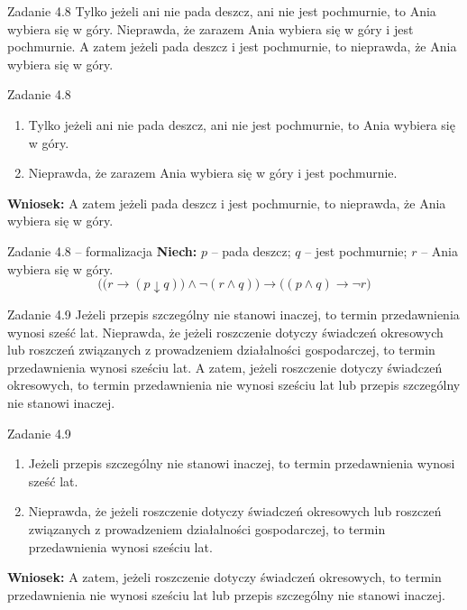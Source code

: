\documentclass[12pt]{beamer}
\begin{document}
\begin{frame}{Zadanie 4.8}
Tylko jeżeli ani nie pada deszcz, ani nie jest pochmurnie, to Ania wybiera się w góry. Nieprawda, że zarazem Ania wybiera się w góry i jest pochmurnie. A zatem jeżeli pada deszcz i jest pochmurnie, to nieprawda, że Ania wybiera się w góry.
\end{frame}

\begin{frame}{Zadanie 4.8}
\begin{enumerate}
    \item[P1.] Tylko jeżeli ani nie pada deszcz, ani nie jest pochmurnie, to Ania wybiera się w góry.
    \item[P2.] Nieprawda, że zarazem Ania wybiera się w góry i jest pochmurnie.
\end{enumerate}
\vspace{6pt}
\textbf{Wniosek:} A zatem jeżeli pada deszcz i jest pochmurnie, to nieprawda, że Ania wybiera się w góry.
\end{frame}

\begin{frame}{Zadanie 4.8 -- formalizacja}
\textbf{Niech:} $p$ -- pada deszcz; $q$ -- jest pochmurnie; $r$ -- Ania wybiera się w góry.
\vspace{10pt}
\[ \Big(\big(r \rightarrow (p \downarrow q)\big) \wedge \neg(r \wedge q)\Big) \rightarrow \big((p \wedge q) \rightarrow \neg r\big) \]
\end{frame}

\begin{frame}{Zadanie 4.9}
\footnotesize
Jeżeli przepis szczególny nie stanowi inaczej, to termin przedawnienia wynosi sześć lat. Nieprawda, że jeżeli roszczenie dotyczy świadczeń okresowych lub roszczeń związanych z prowadzeniem działalności gospodarczej, to termin przedawnienia wynosi sześciu lat. A zatem, jeżeli roszczenie dotyczy świadczeń okresowych, to termin przedawnienia nie wynosi sześciu lat lub przepis szczególny nie stanowi inaczej.
\end{frame}

\begin{frame}{Zadanie 4.9}
\footnotesize
\begin{enumerate}
    \item[P1.] Jeżeli przepis szczególny nie stanowi inaczej, to termin przedawnienia wynosi sześć lat.
    \item[P2.] Nieprawda, że jeżeli roszczenie dotyczy świadczeń okresowych lub roszczeń związanych z prowadzeniem działalności gospodarczej, to termin przedawnienia wynosi sześciu lat.
\end{enumerate}
\vspace{6pt}
\textbf{Wniosek:} A zatem, jeżeli roszczenie dotyczy świadczeń okresowych, to termin przedawnienia nie wynosi sześciu lat lub przepis szczególny nie stanowi inaczej.
\end{frame}
\end{document}
